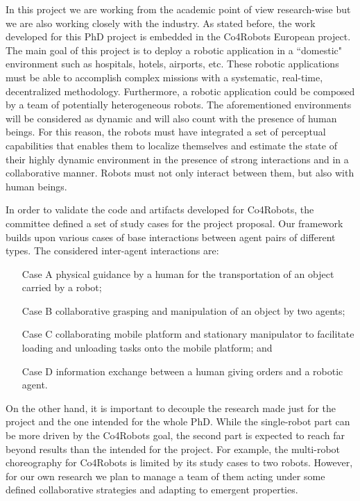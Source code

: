 In this project we are working from the academic point of view research-wise but we are also working closely with the industry.
As stated before, the work developed for this PhD project is embedded in the Co4Robots European project.
The main goal of this project is to deploy a robotic application in a ``domestic" environment such as hospitals, hotels, airports, etc.
These robotic applications must be able to accomplish complex missions with a systematic, real-time, decentralized methodology.
Furthermore, a robotic application could be composed by a team of potentially heterogeneous robots.
The aforementioned environments will be considered as dynamic and will also count with the presence of human beings.
For this reason, the robots must have integrated a set of perceptual capabilities that enables them to localize themselves and estimate the state of their highly dynamic environment in the presence of strong interactions and in a collaborative manner.
Robots must not only interact between them, but also with human beings.

In order to validate the code and artifacts developed for Co4Robots, the committee defined a set of study cases for the project proposal.
Our framework builds upon various cases of base interactions between agent pairs of different types. 
The considered inter-agent interactions are:
\begin{itemize}
\item[Case A] physical guidance by a human for the transportation of an object carried by a robot;
\item[Case B] collaborative grasping and manipulation of an object by two agents;
\item[Case C]collaborating mobile platform and stationary manipulator to facilitate loading and unloading tasks onto the mobile platform; and
\item[Case D] information exchange between a human giving orders and a robotic agent. 
\end{itemize}

On the other hand, it is important to decouple the research made just for the project and the one intended for the whole PhD.
While the single-robot part can be more driven by the Co4Robots goal, the second part is expected to reach far beyond results than the intended for the project.
For example, the multi-robot choreography for Co4Robots is limited by its study cases to two robots.
However, for our own research we plan to manage a team of them acting under some defined collaborative strategies and adapting to emergent properties.

